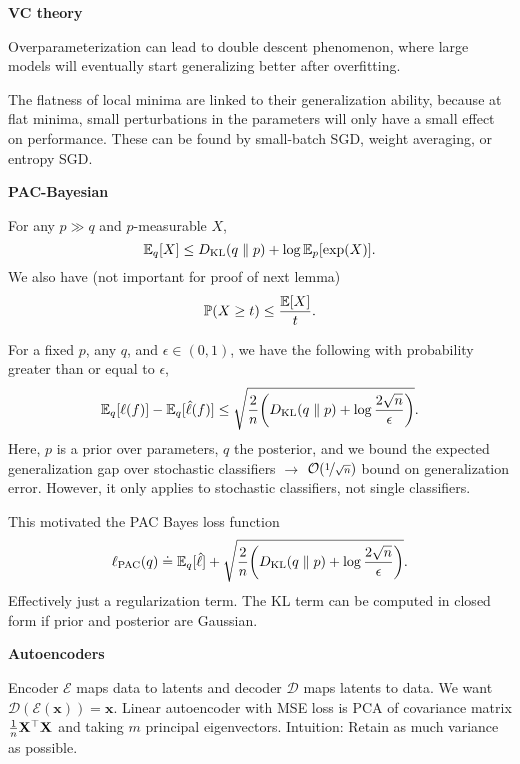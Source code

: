 \documentclass[10pt]{article}
\newenvironment{topic}[1]
{\textbf{\sffamily \footnotesize \colorbox{black}{\rlap{\textbf{\textcolor{white}{#1}}}\hspace{\linewidth}\hspace{-2\fboxsep}}}}
{}
\newenvironment{subtopic}[1]
{\vspace{0.1cm} \begin{center}\textbf{\footnotesize \sffamily #1}\end{center}}
{}
\renewcommand{\mat}[1]{\ensuremath{\mathbf{#1}}}
\renewcommand{\vec}[1]{\ensuremath{\mathbold{#1}}}
\begin{document}
\begin{multicols*}{3}
\begin{topic}{Statistical learning theory}
\begin{subtopic}{VC theory}
            Overparameterization can lead to double descent phenomenon, where large models will eventually
            start generalizing better after overfitting.

            The flatness of local minima are linked to their generalization ability, because at flat minima,
            small perturbations in the parameters will only have a small effect on performance. These can be
            found by small-batch SGD, weight averaging, or entropy SGD.
        \end{subtopic}

        \vfill\null
        \columnbreak

        \begin{subtopic}{PAC-Bayesian}
            For any $p \gg q$ and $p$-measurable $X$, \[
                \mathbb{E}_q[X] \leq D_{\mathrm{KL}}(q \;\|\; p) + \log \mathbb{E}_p[\exp(X)].
            \]
            We also have (not important for proof of next lemma) \[
                \mathbb{P}(X \geq t) \leq \frac{\mathbb{E}[X]}{t}.
            \]

            For a fixed $p$, any $q$, and $\epsilon \in (0,1)$, we have the following with probability greater
            than or equal to $\epsilon$, \[
                \E_q[\ell(f)] - \E_q[\hat{\ell}(f)] \leq \sqrt{\frac{2}{n} \lft( D_{\mathrm{KL}}(q \;\|\; p) + \log \frac{2 \sqrt{n}}{\epsilon} \rgt)}.
            \]
            Here, $p$ is a prior over parameters, $q$ the posterior, and we bound the expected generalization
            gap over stochastic classifiers $\to$ $\bigo{\nicefrac{1}{\sqrt{n}}}$ bound on generalization
            error. However, it only applies to stochastic classifiers, not single classifiers.

            This motivated the PAC Bayes loss function \[
                \ell_{\mathrm{PAC}}(q) \doteq \E_q[\hat{\ell}] + \sqrt{\frac{2}{n} \lft( D_{\mathrm{KL}}(q \;\|\; p) + \log \frac{2\sqrt{n}}{\epsilon} \rgt)}.
            \]
            Effectively just a regularization term. The KL term can be computed in closed form if prior and
            posterior are Gaussian.
        \end{subtopic}

    \end{topic}

    \begin{topic}{Generative models}

        \begin{subtopic}{Autoencoders}
            Encoder $\bm{\mathcal{E}}$ maps data to latents and decoder $\bm{\mathcal{D}}$ maps
            latents to data. We want $\bm{\mathcal{D}}(\bm{\mathcal{E}}(\vec{x})) = \vec{x}$. Linear
            autoencoder with MSE loss is PCA of covariance matrix $\frac{1}{n} \transpose{\mat{X}}
                \mat{X}$ and taking $m$ principal eigenvectors. Intuition: Retain as much variance as possible.


\end{subtopic}
\end{topic}
\end{multicols*}
\end{document}
